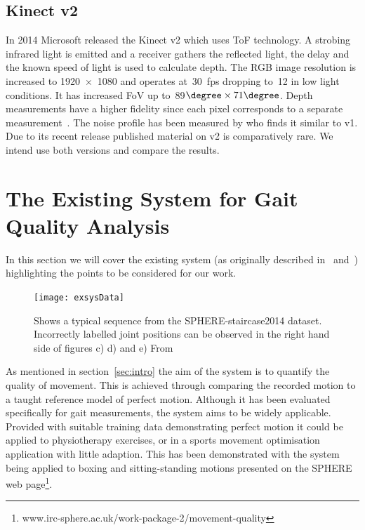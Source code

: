 \documentclass[11pt]{article} %
\begin{document}

\subsection{Kinect v2}

In 2014 Microsoft released the Kinect v2 which uses ToF technology. A strobing infrared light is emitted and a receiver gathers the reflected light, the delay and the known speed of light is used to calculate depth. The RGB image resolution is increased to 1920~$\times$~1080 and operates at~30~fps dropping to~12 in low light conditions. It has increased FoV up to~89$\degree \times 71 \degree$. Depth measurements have a higher fidelity since each pixel corresponds to a separate measurement~\cite{Lun2015}. The noise profile has been measured by \cite{Breuer2014} who finds it similar to v1. Due to its recent release published material on v2 is comparatively rare. We intend use both versions and compare the results. 

\section{The Existing System for Gait Quality Analysis}
\label{sec:exSys}

In this section we will cover the existing system (as originally described in~\cite{Paiement} and~\cite{Tao}) highlighting the points to be considered for our work.
\begin{figure}
\texttt{[image: exsysData]}
\caption{Shows a typical sequence from the SPHERE-staircase2014 dataset.  Incorrectly labelled joint positions can be observed in the right hand side of figures c) d) and e) From \cite{Tao}		\label{fig:exsysData}  } 
\end{figure}

As mentioned in section~\ref{sec:intro} the aim of the system is to quantify the quality of movement. This is achieved through comparing the recorded motion to a taught reference model of perfect motion. Although it has been evaluated specifically for gait measurements, the system aims to be widely applicable. Provided with suitable training data demonstrating perfect motion it could be applied to physiotherapy exercises, or in a sports movement optimisation application with little adaption. This has been demonstrated with the system being applied to boxing and sitting-standing motions presented on the SPHERE web page\footnote{www.irc-sphere.ac.uk/work-package-2/movement-quality}.
\end{document}
